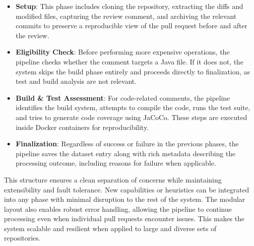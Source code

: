\begin{itemize}
	\item \textbf{Setup}: This phase includes cloning the repository, extracting the diffs and
	      modified files, capturing the review comment, and archiving the relevant commits to preserve
	      a reproducible view of the pull request before and after the review.

	\item \textbf{Eligibility Check}: Before performing more expensive operations, the pipeline
	      checks whether the comment targets a Java file. If it does not, the system skips the
	      build phase entirely and proceeds directly to finalization, as test and build analysis
	      are not relevant.

	\item \textbf{Build \& Test Assessment}: For code-related comments, the pipeline identifies the build system,
	      attempts to compile the code, runs the test suite, and tries to generate code coverage using
	      JaCoCo. These steps are executed inside Docker containers for reproducibility.

	\item \textbf{Finalization}: Regardless of success or failure in the previous phases, the
	      pipeline saves the dataset entry along with rich metadata describing the processing outcome,
	      including reasons for failure when applicable.
\end{itemize}

This structure ensures a clean separation of concerns while maintaining extensibility and fault
tolerance. New capabilities or heuristics can be integrated into any phase with minimal disruption
to the rest of the system. The modular layout also enables robust error handling, allowing the
pipeline to continue processing even when individual pull requests encounter issues. This makes the
system scalable and resilient when applied to large and diverse sets of repositories.

